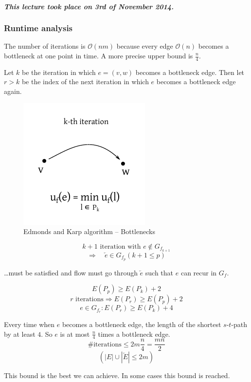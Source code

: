 \documentclass{article}
\newcommand{\dateref}[1]{\paragraph{\textit{This lecture took place on #1.}}}
\newcommand{\gath}[2]{$#1$-$#2$-path} %
\begin{document}
\dateref{3rd of November 2014}

\subsubsection{Runtime analysis}

The number of iterations is $\mathcal{O}(nm)$ because every edge $\mathcal{O}(n)$ becomes a bottleneck at one point in time. A more precise upper bound is $\frac{n}{4}$.

Let $k$ be the iteration in which $e = (v, w)$ becomes a bottleneck edge. Then let $r > k$ be the index of the next iteration in which $e$ becomes a bottleneck edge again.

\begin{figure}[ht]
 \begin{center}
  \includegraphics{img/ek_bottleneck.pdf}
  \caption{Edmonds and Karp algorithm -- Bottlenecks}
 \end{center}
\end{figure}

\[
  k+1 \text{ iteration with } e \notin G_{f_{k+1}}
\] \[
  \Rightarrow \quad \overleftarrow{e} \in G_{f_p}(k+1 \leq p)
\]
\begin{center}
  \dots must be satisfied and flow must go through $\overleftarrow{e}$ such that $e$ can recur in $G_f$.
\end{center}

\[ E(P_p) \geq E(P_k) + 2 \]
\[ r \text{ iterations} \Rightarrow E(P_r) \geq E(P_p) + 2 \]
\[ e \in G_{f_r}: E(P_r) \geq E(P_k) + 4 \]

Every time when $e$ becomes a bottleneck edge, the length of the shortest \gath st by at least $4$. So $e$ is at most $\frac n4$ times a bottleneck edge.
\[
  \#\text{iterations} \leq 2m \frac n4 = \frac{mn}2
\] \[
  (|E| \cup |\overleftarrow{E}| \leq 2m)
\]

This bound is the best we can achieve. In some cases this bound is reached.
\end{document}
